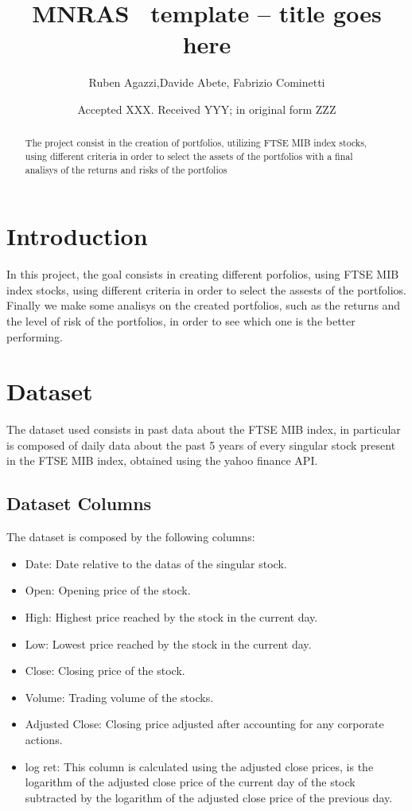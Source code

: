 \documentclass[fleqn,usenatbib]{mnras}
\title[Short title, max. 45 characters]{MNRAS \LaTeXe\ template -- title goes here}
\author[Ruben Agazzi, Davide Abete]
{Ruben Agazzi,Davide Abete, Fabrizio Cominetti
\\
}
\date{Accepted XXX. Received YYY; in original form ZZZ}
\begin{document}
\label{firstpage}
\pagerange{\pageref{firstpage}--\pageref{lastpage}}
\maketitle

\begin{abstract}
The project consist in the creation of portfolios, utilizing FTSE MIB index stocks, using different criteria in order to select the assets of the portfolios with a final analisys of the returns and risks of the portfolios
\end{abstract}




\section{Introduction} 
In this project, the goal consists in creating different porfolios, using FTSE MIB index stocks, using different criteria in order to select the assests of the portfolios. Finally we make some analisys on the created portfolios, such as the returns and the level of risk of the portfolios, in order to see which one is the better performing.
\section{Dataset}
The dataset used consists in past data about the FTSE MIB index, in particular is composed of daily data about the past 5 years of every singular stock present in the FTSE MIB index, obtained using the yahoo finance API.
\subsection{Dataset Columns}
The dataset is composed by the following columns:
\begin{itemize}
	\item Date: Date relative to the datas of the singular stock.
	\item Open: Opening price of the stock.
	\item High: Highest price reached by the stock in the current day.
	\item Low: Lowest price reached by the stock in the current day.
	\item Close: Closing price of the stock.
	\item Volume: Trading volume of the stocks.
	\item Adjusted Close: Closing price adjusted after accounting for any corporate actions.
	\item log ret: This column is calculated using the adjusted close prices, is the logarithm of the adjusted close price of the current day of the stock subtracted by the logarithm of the adjusted close price of the previous day.
\end{itemize}
\end{document}
